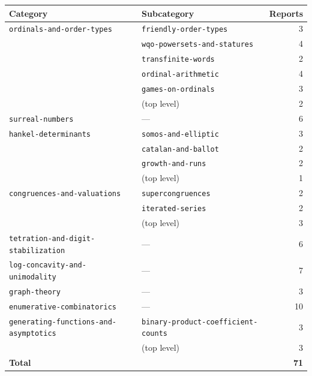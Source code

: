 \documentclass[11pt]{article}
\newcommand{\dir}[1]{\texttt{#1}}
\begin{document}
\begin{center}
\begin{tabular}{@{}llr@{}}
\toprule
\textbf{Category} & \textbf{Subcategory} & \textbf{Reports}\\
\midrule
\dir{ordinals-and-order-types}    & \dir{friendly-order-types}          & 3\\
                                  & \dir{wqo-powersets-and-statures}    & 4\\
                                  & \dir{transfinite-words}             & 2\\
                                  & \dir{ordinal-arithmetic}            & 4\\
                                  & \dir{games-on-ordinals}             & 3\\
                                  & (top level)                         & 2\\
\midrule
\dir{surreal-numbers}             & ---                                 & 6\\
\midrule
\dir{hankel-determinants}         & \dir{somos-and-elliptic}            & 3\\
                                  & \dir{catalan-and-ballot}            & 2\\
                                  & \dir{growth-and-runs}               & 2\\
                                  & (top level)                         & 1\\
\midrule
\dir{congruences-and-valuations}  & \dir{supercongruences}              & 2\\
                                  & \dir{iterated-series}               & 2\\
                                  & (top level)                         & 3\\
\midrule
\dir{tetration-and-digit-stabilization} & ---                           & 6\\
\midrule
\dir{log-concavity-and-unimodality}     & ---                           & 7\\
\midrule
\dir{graph-theory}                      & ---                           & 3\\
\midrule
\dir{enumerative-combinatorics}         & ---                           & 10\\
\midrule
\dir{generating-functions-and-asymptotics}
                                  & \dir{binary-product-coefficient-counts} & 3\\
                                  & (top level)                         & 3\\
\midrule
\multicolumn{2}{l}{\textbf{Total}} & \textbf{71}\\
\bottomrule
\end{tabular}
\end{center}
\end{document}
